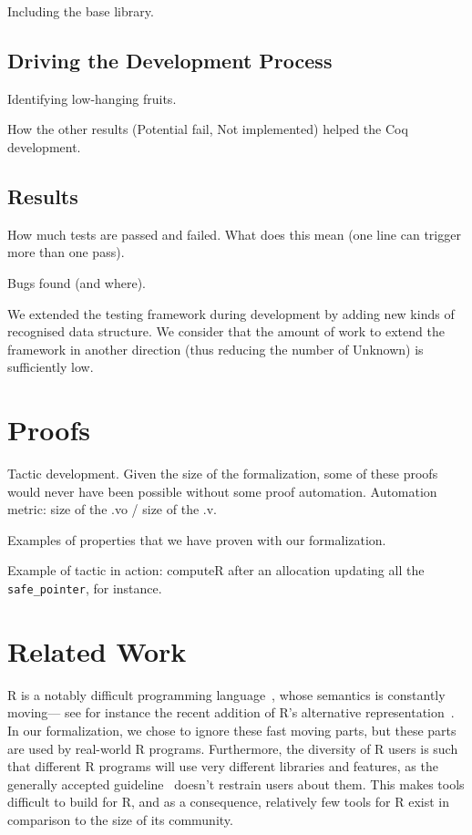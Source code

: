 \documentclass[
    sigplan,
    10pt,
    review, %
    natbib=false %
 ]{acmart}
\begin{document}
Including the base library.

\subsection{Driving the Development Process}
\label{sec:driving:development}

Identifying low-hanging fruits.

How the other results (Potential fail, Not implemented) helped the Coq development.

\subsection{Results}
\label{sec:test:results}

How much tests are passed and failed.
What does this mean (one line can trigger more than one pass).

Bugs found (and where).

We extended the testing framework during development by adding new kinds of recognised
data structure.
We consider that the amount of work to extend the framework in another direction
(thus reducing the number of Unknown) is sufficiently low.

\section{Proofs}
\label{sec:proofs}

Tactic development.
Given the size of the formalization, some of these proofs would never have been possible
without some proof automation.
Automation metric: size of the .vo / size of the .v.

Examples of properties that we have proven with our formalization.

Example of tactic in action:
computeR after an allocation updating all the \texttt{safe_pointer}, for instance.

\section{Related Work}
\label{sec:related:work}

R is a notably difficult programming language~\parencite{RInferno},
whose semantics is constantly moving—%
see for instance the recent addition
of R's alternative representation~\parencite{altrepR}.
In our formalization, we chose to ignore these fast moving parts,
but these parts are used by real-world R programs.
Furthermore, the diversity of R users is such that different R programs
will use very different libraries and features,
as the generally accepted guideline~\parencite{RGuidelines}
doesn't restrain users about them.
This makes tools difficult to build for R,
and as a consequence, relatively few tools for R exist
in comparison to the size of its community.
\end{document}
